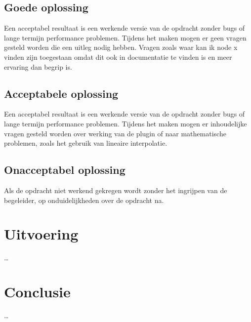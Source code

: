 \subsection{Goede oplossing}
Een acceptabel resultaat is een werkende versie van de opdracht zonder bugs of lange termijn performance problemen. Tijdens het maken mogen er geen vragen gesteld worden die een uitleg nodig hebben. Vragen zoals waar kan ik node x vinden zijn toegestaan omdat dit ook in documentatie te vinden is en meer ervaring dan begrip is. 

\subsection{Acceptabele oplossing}
Een acceptabel resultaat is een werkende versie van de opdracht zonder bugs of lange termijn performance problemen. Tijdens het maken mogen er inhoudelijke vragen gesteld worden over werking van de plugin of naar mathematische problemen, zoals het gebruik van lineaire interpolatie.

\subsection{Onacceptabel oplossing}
Als de opdracht niet werkend gekregen wordt zonder het ingrijpen van de begeleider, op onduidelijkheden over de opdracht na.  

\section{Uitvoering}
\dots

\section{Conclusie}
\dots
